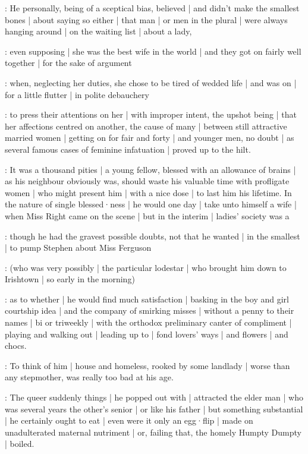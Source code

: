 :
He personally,
being of a sceptical bias,
believed |
and didn't make the smallest bones |
about saying so either |
that man |
or men in the plural |
were always hanging around |
on the waiting list |
about a lady,

:
even supposing |
she was the best wife in the world |
and they got on fairly well together |
for the sake of argument

:
when,
neglecting her duties,
she chose to be tired of wedded life |
and was on |
for a little flutter |
in polite debauchery

:
to press their attentions on her |
with improper intent,
the upshot being |
that her affections centred on another,
the cause of many  |
between still attractive married women |
getting on for fair and forty |
and younger men,
no doubt |
as several famous cases of feminine infatuation |
proved up to the hilt.

:
It was a thousand pities |
a young fellow,
blessed with an allowance of brains |
as his neighbour obviously was,
should waste his valuable time with profligate women |
who might present him |
with a nice dose |
to last him his lifetime.
In the nature of single blessed·ness |
he would one day |
take unto himself a wife |
when Miss Right came on the scene |
but in the interim |
ladies' society was a 

:
though he had the gravest possible doubts,
not that he wanted |
in the smallest |
to pump Stephen about Miss Ferguson%

:
(who was very possibly |
the particular lodestar |
who brought him down to Irishtown |
so early in the morning)

:
as to whether |
he would find much satisfaction |
basking in the boy and girl courtship idea |
and the company of smirking misses |
without a penny to their names |
bi or triweekly |
with the orthodox preliminary canter of compliment |
playing and walking out |
leading up to |
fond lovers' ways |
and flowers |
and chocs.

:
To think of him |
house and homeless,
rooked by some landlady |
worse than any stepmother,
was really too bad at his age.

:
The queer suddenly things |
he popped out with |
attracted the elder man |
who was several years the other's senior |
or like his father |
but something substantial |
he certainly ought to eat |
even were it only an egg·flip |
made on unadulterated maternal nutriment |
or,
failing that,
the homely Humpty Dumpty |
boiled.

